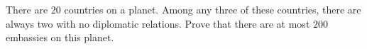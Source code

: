 There are $20$ countries on a planet. Among any three of these countries, there are always two with no diplomatic relations. Prove that there are at most $200$ embassies on this planet.
